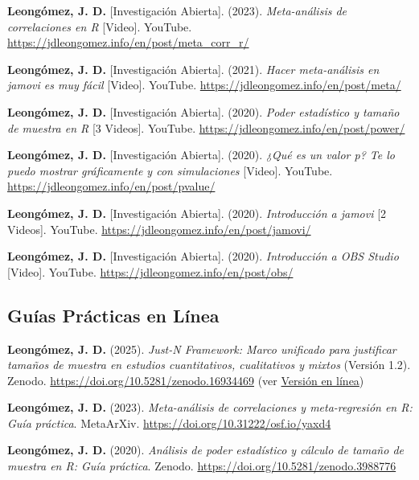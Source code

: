 \documentclass[11pt,a4paper,]{awesome-cv}
\begin{document}
\begingroup
  \footnotesize
  \setlength{\parindent}{-0.5in}
  \setlength{\leftskip}{0.5in}

\textbf{Leongómez, J. D.} {[}Investigación Abierta{]}. (2023).
\emph{Meta-análisis de correlaciones en R} {[}Video{]}. YouTube.
\url{https://jdleongomez.info/en/post/meta_corr_r/}

\textbf{Leongómez, J. D.} {[}Investigación Abierta{]}. (2021).
\emph{Hacer meta-análisis en jamovi es muy fácil} {[}Video{]}. YouTube.
\url{https://jdleongomez.info/en/post/meta/}

\textbf{Leongómez, J. D.} {[}Investigación Abierta{]}. (2020).
\emph{Poder estadístico y tamaño de muestra en R} {[}3 Videos{]}.
YouTube. \url{https://jdleongomez.info/en/post/power/}

\textbf{Leongómez, J. D.} {[}Investigación Abierta{]}. (2020).
\emph{¿Qué es un valor p? Te lo puedo mostrar gráficamente y con
simulaciones} {[}Video{]}. YouTube.
\url{https://jdleongomez.info/en/post/pvalue/}

\textbf{Leongómez, J. D.} {[}Investigación Abierta{]}. (2020).
\emph{Introducción a jamovi} {[}2 Videos{]}. YouTube.
\url{https://jdleongomez.info/en/post/jamovi/}

\textbf{Leongómez, J. D.} {[}Investigación Abierta{]}. (2020).
\emph{Introducción a OBS Studio} {[}Video{]}. YouTube.
\url{https://jdleongomez.info/en/post/obs/}

\endgroup

\subsection{\texorpdfstring{\textbf{Guías Prácticas en Línea}}{}}\label{section-4}

\begingroup
  \footnotesize
  \setlength{\parindent}{-0.5in}
  \setlength{\leftskip}{0.5in}

\textcolor{teal}{\faStar} \textbf{Leongómez, J. D.} (2025). \emph{Just-N
Framework: Marco unificado para justificar tamaños de muestra en
estudios cuantitativos, cualitativos y mixtos} (Versión 1.2). Zenodo.
\url{https://doi.org/10.5281/zenodo.16934469} (ver
\href{https://jdleongomez.github.io/just_n/}{Versión en línea})

\textcolor{teal}{\faStar} \textbf{Leongómez, J. D.} (2023).
\emph{Meta-análisis de correlaciones y meta-regresión en R: Guía
práctica}. MetaArXiv. \url{https://doi.org/10.31222/osf.io/yaxd4}

\textcolor{teal}{\faStar} \textbf{Leongómez, J. D.} (2020).
\emph{Análisis de poder estadístico y cálculo de tamaño de muestra en R:
Guía práctica}. Zenodo. \url{https://doi.org/10.5281/zenodo.3988776}
\end{document}
